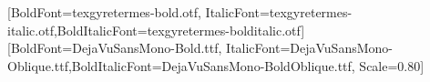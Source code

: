 \usepackage{tikz}
\usetikzlibrary{arrows.meta,positioning,fit,backgrounds,calc}
\usepackage{booktabs}
\usepackage{array}
\usepackage{amsmath}
\usepackage{amssymb}
\usepackage{fontspec}
\setmainfont{texgyretermes-regular.otf}[BoldFont=texgyretermes-bold.otf,
  ItalicFont=texgyretermes-italic.otf,BoldItalicFont=texgyretermes-bolditalic.otf]
\setmonofont{DejaVuSansMono.ttf}[BoldFont=DejaVuSansMono-Bold.ttf,
  ItalicFont=DejaVuSansMono-Oblique.ttf,BoldItalicFont=DejaVuSansMono-BoldOblique.ttf,
  Scale=0.80]
\usepackage{fancyvrb}
\usepackage{fvextra}
\let\oldverbatim\verbatim
\renewcommand{\verbatim}{\scriptsize\oldverbatim}
\usepackage{newunicodechar}
\providecommand{\tightlist}{\setlength{\itemsep}{0pt}\setlength{\parskip}{0pt}}
\renewcommand\thetable{\arabic{table}}
\usepackage{dblfloatfix}
\renewcommand{\topfraction}{0.9}
\renewcommand{\dbltopfraction}{0.9}
\renewcommand{\textfraction}{0.05}
\renewcommand{\floatpagefraction}{0.8}
\setcounter{topnumber}{3}
\setcounter{dbltopnumber}{4}
\setcounter{totalnumber}{5}
